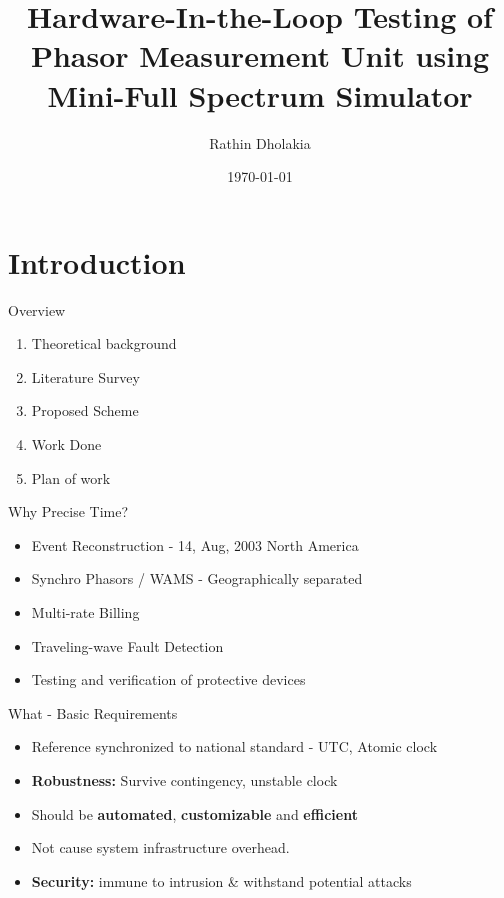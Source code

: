 \documentclass{beamer}
\title{Hardware-In-the-Loop Testing of Phasor Measurement Unit using Mini-Full Spectrum Simulator}
\date{\today}
\author{Rathin Dholakia}
\institute{MTP Stage - 1}
\begin{document}
  \maketitle
  \section{Introduction}


  \begin{frame}{Overview}
 	\begin{enumerate}
  	\item Theoretical background
  	\item Literature Survey
  	\item Proposed Scheme
  	\item Work Done
  	\item Plan of work
 	\end{enumerate}
   \end{frame}
 
 
     \begin{frame}{Why Precise Time?}
   	 \begin{center}
		\begin{itemize}
		\item Event Reconstruction - 14, Aug, 2003 North America 
		\item Synchro Phasors / WAMS - Geographically separated
		\item Multi-rate Billing
		\item Traveling-wave Fault Detection 
		\item Testing and verification of protective devices
		\end{itemize}
   	 \end{center}
     \end{frame}
 
   \begin{frame}{What - Basic Requirements}
	 \begin{itemize}
	 	\item Reference synchronized to national standard - UTC, Atomic clock
	 	\item \textbf{Robustness:} Survive contingency, unstable clock
	 	\item Should be \textbf{automated}, \textbf{customizable} and \textbf{efficient}
	 	\item Not cause system infrastructure overhead.
	 	\item \textbf{Security:} immune to intrusion \& withstand potential attacks
	 \end{itemize}
   
   \end{frame}
\end{document}
